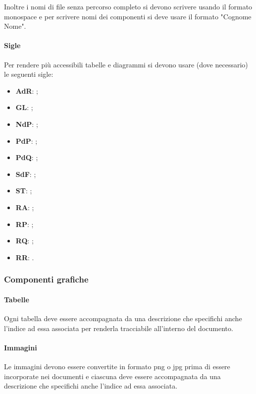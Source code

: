 \documentclass[../NormeDiProgetto.tex]{subfiles}
\begin{document}
					Inoltre i nomi di file senza percorso completo si devono scrivere usando il
					formato monospace e per scrivere nomi dei componenti si deve usare il formato
					"Cognome Nome". 
				\paragraph{Sigle\\}
					Per rendere più accessibili tabelle e diagrammi si devono usare (dove
					necessario) le seguenti sigle:
					\begin{itemize}
						\item \textbf{AdR}: \analisideirequisiti;
						\item \textbf{GL}: \glossario;
						\item \textbf{NdP}: \normediprogetto;
						\item \textbf{PdP}: \pianodiprogetto;
						\item \textbf{PdQ}: \pianodiqualifica;
						\item \textbf{SdF}: \normediprogetto;
						\item \textbf{ST}: \specificatecnica;
						\item \textbf{RA}: \revisionediaccettazione;
						\item \textbf{RP}: \revisionediprogettazione;
						\item \textbf{RQ}: \revisionediqualifica;
						\item \textbf{RR}: \revisionedeirequisiti.
					\end{itemize}
			\subsubsection{Componenti grafiche}
				\paragraph{Tabelle\\}
					Ogni tabella deve essere accompagnata da una descrizione che specifichi anche
					l'indice ad essa associata per renderla tracciabile all'interno del documento.
				\paragraph{Immagini\\}
					Le immagini devono essere convertite in formato png o jpg prima di essere incorporate nei
					documenti e ciascuna deve essere accompagnata da una descrizione che specifichi anche l'indice ad
					essa associata.
\end{document}
